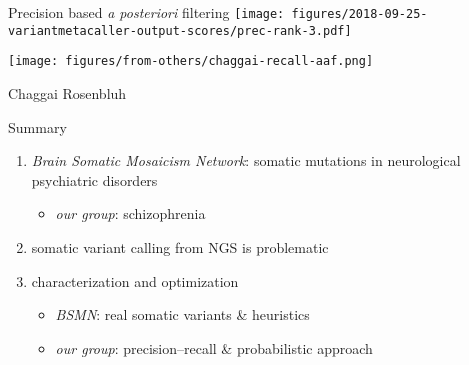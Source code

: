 \documentclass{beamer}
\begin{document}
\begin{frame}{Precision based \emph{a posteriori} filtering}
\texttt{[image: figures/2018-09-25-variantmetacaller-output-scores/prec-rank-3.pdf]}
\end{frame}

\begin{frame}
\texttt{[image: figures/from-others/chaggai-recall-aaf.png]}

\tiny{Chaggai Rosenbluh}
\end{frame}

\begin{frame}{Summary}
\begin{enumerate}
\item
\emph{Brain Somatic Mosaicism Network}:
\alert{somatic mutations} in neurological psychiatric disorders\\
\begin{itemize}
\item \emph{our group}: schizophrenia
\end{itemize}
\item somatic \alert{variant calling} from NGS is problematic
\item characterization and \alert{optimization}
\begin{itemize}
\item \emph{BSMN}: real somatic variants \& heuristics
\item \emph{our group}: precision--recall \& probabilistic approach
\end{itemize}
\end{enumerate}
\end{frame}
\end{document}
